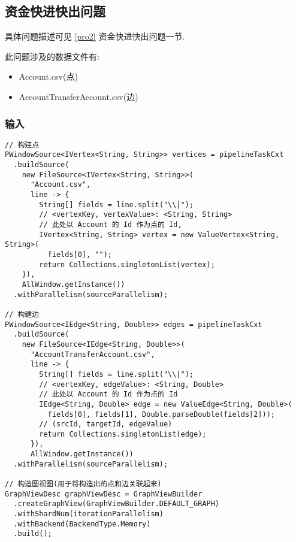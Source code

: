 \subsection{资金快进快出问题}
具体问题描述可见 \ref{pro2} 资金快进快出问题一节.

此问题涉及的数据文件有:
\begin{itemize}
  \item Account.csv(点)
  \item AccountTransferAccount.csv(边)
\end{itemize}

\subsubsection{输入}
\begin{center}
\begin{verbatim}
// 构建点
PWindowSource<IVertex<String, String>> vertices = pipelineTaskCxt
  .buildSource(
    new FileSource<IVertex<String, String>>(
      "Account.csv",
      line -> {
        String[] fields = line.split("\\|");
        // <vertexKey, vertexValue>: <String, String>
        // 此处以 Account 的 Id 作为点的 Id,
        IVertex<String, String> vertex = new ValueVertex<String, String>(
          fields[0], "");
        return Collections.singletonList(vertex);
    }),
    AllWindow.getInstance())
  .withParallelism(sourceParallelism);

// 构建边
PWindowSource<IEdge<String, Double>> edges = pipelineTaskCxt
  .buildSource(
    new FileSource<IEdge<String, Double>>(
      "AccountTransferAccount.csv",
      line -> {
        String[] fields = line.split("\\|");
        // <vertexKey, edgeValue>: <String, Double>
        // 此处以 Account 的 Id 作为点的 Id
        IEdge<String, Double> edge = new ValueEdge<String, Double>(
          fields[0], fields[1], Double.parseDouble(fields[2]));
        // (srcId, targetId, edgeValue)
        return Collections.singletonList(edge);
      }),
      AllWindow.getInstance())
  .withParallelism(sourceParallelism);

// 构造图视图(用于将构造出的点和边关联起来)
GraphViewDesc graphViewDesc = GraphViewBuilder
  .createGraphView(GraphViewBuilder.DEFAULT_GRAPH)
  .withShardNum(iterationParallelism)
  .withBackend(BackendType.Memory)
  .build();
\end{verbatim}
\end{center}

